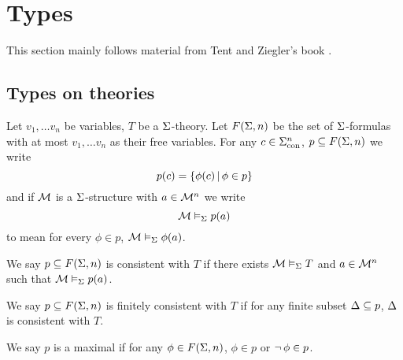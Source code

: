 \section{Types}
This section mainly follows material from Tent and Ziegler's book \cite{tent}.
\subsection{Types on theories}
\begin{dfn}
    Let ${v_1,\dots v_n}$ be variables,
    $T$ be a $\Sigma$-theory.
    Let $F(\Sigma,n)$ be the set of $\Sigma$-formulas with at most 
    $v_1,\dots v_n$ as their free variables.
    For any $c \in {\Sigma}_\mathrm{con}^n$, $p \subseteq F(\Sigma,n)$
    we write 
    \[p(c) = \left\{\phi(c) \,|\, \phi \in p\right\}\]
    and if $\mathcal{M}$ is a $\Sigma$-structure with $a \in {\mathcal{M}}^n$ we write 
    \[\mathcal{M} \vDash_{\Sigma} p(a)\]
    to mean for every $\phi \in p$, $\mathcal{M} \vDash_{\Sigma} \phi(a)$.

    We say $p \subseteq F(\Sigma,n)$ is consistent with $T$ if there exists 
    $\mathcal{M} \vDash_{\Sigma} T$ and $a \in {\mathcal{M}}^n$
    such that $\mathcal{M} \vDash_{\Sigma} p(a)$. 

    We say $p \subseteq F(\Sigma,n)$ is finitely consistent with $T$ 
    if for any finite subset $\Delta \subseteq p$, 
    $\Delta$ is consistent with $T$.

    We say $p$ is a maximal if for any $\phi \in F(\Sigma,n)$,
    $\phi \in p$ or $\neg\, \phi \in p$.
\end{dfn}


